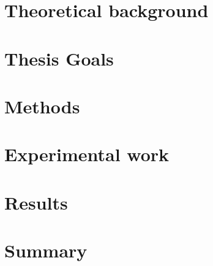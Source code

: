 \documentclass[justified,nofonts,nobib,openany]{tufte-book}
\begin{document}
\tableofcontents %

\chapter{Theoretical background}\label{chap:background}


\chapter{Thesis Goals}\label{chap:goals}


\chapter{Methods}\label{chap:methods}

	
\chapter{Experimental work}\label{chap:Experimental_work}


\chapter{Results}


\chapter{Summary}\label{chap:summary}


\printbibliography
\end{document}
